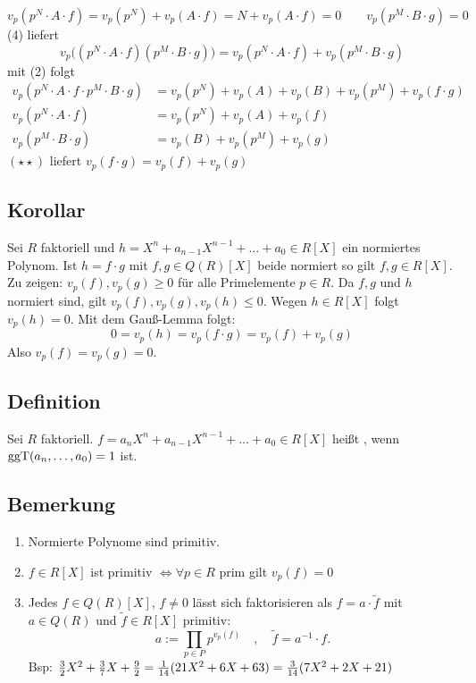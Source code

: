 \[
	v_p(p^N \cdot A \cdot f) = v_p(p^N)+ v_p(A \cdot f) = N + v_p(A \cdot f) = 0 \qquad v_p(p^M \cdot B \cdot g) = 0
\]
(4) liefert 
\[
	v_p\big((p^N \cdot A \cdot f)(p^M \cdot B \cdot g) \big) = v_p(p^N \cdot A \cdot f) + v_p(p^M \cdot B \cdot g) \tag{$\star\star$}
\]
mit (2) folgt
\begin{align*}
	v_p(p^N \cdot A \cdot f \cdot p^M \cdot B \cdot g) &= v_p(p^N) + v_p(A) + v_p(B) + v_p(p^M) + v_p(f \cdot g) \\
	v_p(p^N \cdot A \cdot f) &= v_p(p^N) + v_p(A) + v_p(f) \\
	v_p(p^M \cdot B \cdot g) &= v_p(B) + v_p(p^M) + v_p(g)
\end{align*}
$(\star\star)$ liefert $v_p(f \cdot g) = v_p(f) + v_p(g)$ \bewende

\subsection[{Korollar: Normierte Faktoren von $h \in R[X]$ sind auch in $R[X]$}]{Korollar} %
\label{sub:814}
Sei $R$ faktoriell und $h=X^n + a_{n-1} X^{n-1} + \ldots + a_0 \in R[X]$ ein normiertes Polynom. Ist $h=f \cdot g$ mit $f,g \in Q(R)[X]$ beide normiert so gilt 
$f,g  \in R[X]$.
Zu zeigen: $v_p(f), v_p(g) \ge 0$ für alle Primelemente $p \in R$. Da $f,g$ und $h$ normiert sind, gilt $v_p(f), v_p(g), v_p(h) \le 0$. Wegen $h \in R[X]$ folgt $v_p(h)=0$. Mit dem Gauß-Lemma folgt: 
\[
	0 = v_p(h)= v_p(f \cdot g) = v_p(f) + v_p(g) 
\]
Also $v_p(f)= v_p(g)=0$. \bewende

\subsection[Definition: Primitives Polynom]{Definition} %
\label{sub:815}
Sei $R$ faktoriell. $f= a_n X^n + a_{n-1} X^{n-1} + \ldots + a_0 \in R[X]$ heißt , wenn $\operatorname{ggT}(a_n, \ldots , a_0)=1$ ist.

\subsection[Bemerkungen zu primitiven Polynomen]{Bemerkung} %
\label{sub:816}
\begin{enumerate}[(1)]
	\item Normierte Polynome sind primitiv.
	\item $f \in R[X]$ ist primitiv $\iff \forall  p \in R $ prim gilt $v_p(f)= 0$
	\item Jedes $f \in Q(R)[X]$, $f\not= 0$ lässt sich faktorisieren als $f= a \cdot \tilde f$ mit $a \in Q(R)$ und $\tilde f \in R[X]$ primitiv:
	\[
		a := \prod_{p \in P} p^{v_p(f)} \quad , \quad \tilde f = a ^{-1} \cdot f.
	\]
	Bsp: $\frac{3}{2} X^2 + \frac{3}{7}X + \frac{9}{2}  = \frac{1}{14} (21 X^2 +6 X + 63)  = \frac{3}{14} (7 X^2 +2 X + 21)$
\end{enumerate}


